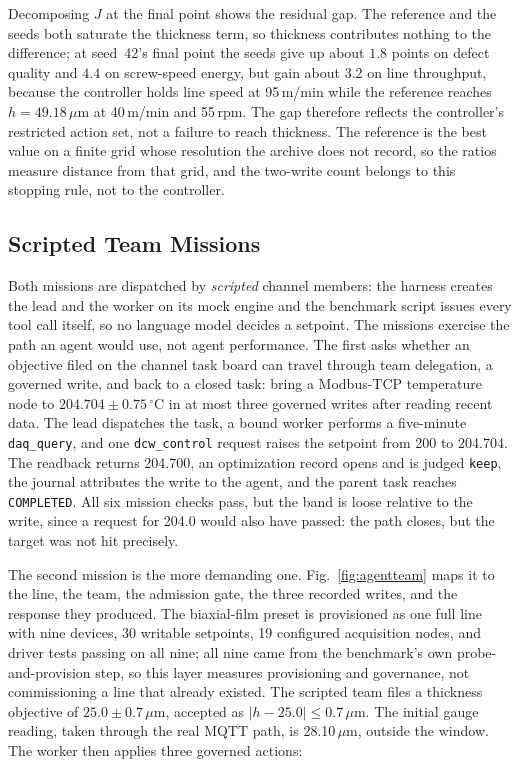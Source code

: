 Decomposing $J$ at the final point shows the residual gap. The reference and the
seeds both saturate the thickness term, so thickness contributes nothing to the
difference; at seed~42's final point the seeds give up about $1.8$ points on defect quality and $4.4$ on screw-speed energy, but gain about $3.2$ on line throughput, because the controller
holds line speed at 95\,m/min while the reference reaches $h=49.18\,\mu$m at
40\,m/min and 55\,rpm. The gap therefore reflects the controller's restricted action set, not a failure to reach thickness. The reference is the best value on a finite grid
whose resolution the archive does not record, so the ratios measure distance from
that grid, and the two-write count belongs to this stopping rule, not to the
controller.

\subsection{Scripted Team Missions}
\label{sec:agentloop}
Both missions are dispatched by \emph{scripted} channel members: the harness creates
the lead and the worker on its mock engine and the benchmark script issues every
tool call itself, so no language model decides a setpoint. The missions exercise the
path an agent would use, not agent performance. The first asks whether an objective
filed on the channel task board can travel through team delegation, a governed
write, and back to a closed task: bring a Modbus-TCP temperature node to
$204.704\pm0.75\,^\circ$C in at most three governed writes after reading recent
data. The lead dispatches the task, a bound worker performs a five-minute
\texttt{daq\_query}, and one \texttt{dcw\_control} request raises the setpoint from
200 to 204.704. The readback returns 204.700, an optimization record opens and is
judged \texttt{keep}, the journal attributes the write to the agent, and the parent
task reaches \texttt{COMPLETED}. All six mission checks pass, but the band is loose
relative to the write, since a request for 204.0 would also have passed: the path
closes, but the target was not hit precisely.

The second mission is the more demanding one. Fig.~\ref{fig:agentteam} maps it to
the line, the team, the admission gate, the three recorded writes, and the
response they produced. The biaxial-film preset is provisioned as one full line with nine
devices, 30 writable setpoints, 19 configured acquisition nodes, and driver tests
passing on all nine; all nine came from the benchmark's own probe-and-provision
step, so this layer measures provisioning and governance, not commissioning a line
that already existed. The scripted team files a thickness objective of
$25.0\pm0.7\,\mu$m, accepted as $|h-25.0|\leq0.7\,\mu$m. The initial gauge reading,
taken through the real MQTT path, is 28.10\,$\mu$m, outside the window. The worker
then applies three governed actions:


